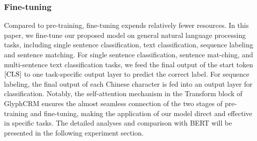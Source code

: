 \subsubsection{Fine-tuning} Compared to pre-training, fine-tuning expends relatively fewer resources. In this paper, we fine-tune our proposed model on general natural language processing tasks, including single sentence classification, text classification, sequence labeling and sentence matching. For single sentence classification, sentence mat-ching, and multi-sentence text classification tasks, we feed the final output of the start token $\rm[CLS]$ to one task-specific output layer to predict the correct label. For sequence labeling, the final output of each Chinese character is fed into an output layer for classification. Notably, the self-attention mechanism in the Transform block of GlyphCRM ensures the almost seamless connection of the two stages of pre-training and fine-tuning, making the application of our model direct and effective in specific tasks. The detailed analyses and comparison with BERT will be presented in the following experiment section. 



